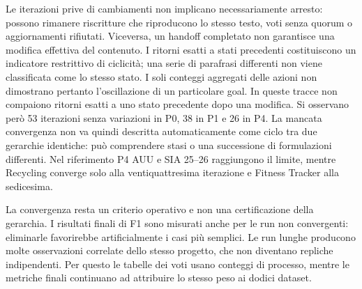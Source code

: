 Le iterazioni prive di cambiamenti non implicano necessariamente arresto:
possono rimanere riscritture che riproducono lo stesso testo, voti senza
quorum o aggiornamenti rifiutati. Viceversa, un handoff completato non
garantisce una modifica effettiva del contenuto. I ritorni esatti a stati
precedenti costituiscono un indicatore restrittivo di ciclicit\`a; una
serie di parafrasi differenti non viene classificata come lo stesso stato.
I soli conteggi aggregati delle azioni non dimostrano pertanto l'oscillazione
di un particolare goal.
In queste tracce non compaiono ritorni esatti a uno stato precedente
dopo una modifica. Si osservano per\`o 53 iterazioni senza variazioni
in P0, 38 in P1 e 26 in P4. La mancata convergenza non va quindi
descritta automaticamente come ciclo tra due gerarchie identiche:
pu\`o comprendere stasi o una successione di formulazioni differenti.
Nel riferimento P4 AUU e SIA 25--26 raggiungono il limite, mentre
Recycling converge solo alla ventiquattresima iterazione e Fitness
Tracker alla sedicesima.

La convergenza resta un criterio operativo e non una certificazione della
gerarchia. I risultati finali di F1 sono misurati anche per le run non
convergenti: eliminarle favorirebbe artificialmente i casi pi\`u semplici.
Le run lunghe producono molte osservazioni correlate dello stesso progetto,
che non diventano repliche indipendenti. Per questo le tabelle dei voti
usano conteggi di processo, mentre le metriche finali continuano ad
attribuire lo stesso peso ai dodici dataset.
